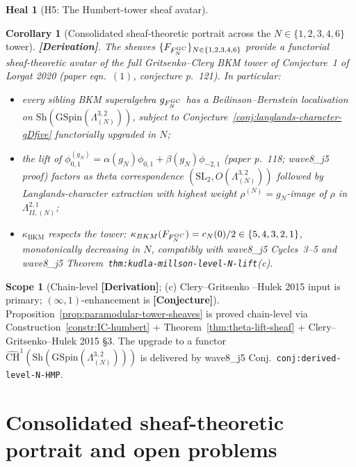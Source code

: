\documentclass[11pt]{amsart}
\newtheorem{corollary}[theorem]{Corollary}
\theoremstyle{definition}
\newtheorem{heal}[attack]{Heal}
\newtheorem{scope}[theorem]{Scope}
\providecommand{\kBKM}{\kappa_{\mathrm{BKM}}}
\providecommand{\Sh}{\mathrm{Sh}}
\providecommand{\GSpin}{\mathrm{GSpin}}
\providecommand{\SL}{\mathrm{SL}}
\providecommand{\cF}{\mathcal{F}}
\providecommand{\cCH}{\widehat{\mathrm{CH}}}
\providecommand{\ClaimStatusDerivation}{\textbf{[Derivation]}}
\begin{document}
\begin{heal}[H5: The Humbert-tower sheaf avatar]
\begin{corollary}[Consolidated sheaf-theoretic portrait across the
$N \in \{1, 2, 3, 4, 6\}$ tower]\label{cor:tower-portrait}
\ClaimStatusDerivation.  The sheaves $\{\cF_{F^{\rm GC}_N}\}_{N \in
\{1, 2, 3, 4, 6\}}$ provide a functorial sheaf-theoretic avatar of
the full Gritsenko--Clery BKM tower of Conjecture~1 of Lorgat 2020
(paper eqn.~$(1)$, conjecture p.~121). In particular:
\begin{itemize}
 \item every sibling BKM superalgebra $\mathfrak{g}_{F^{\rm GC}_N}$
   has a Beilinson--Bernstein localisation on
   $\Sh(\GSpin(\Lambda^{3,2}_{(N)}))$, subject to
   Conjecture~\ref{conj:langlands-character-gDfive} functorially
   upgraded in $N$;
 \item the lift of $\phi^{(g_N)}_{0,1} = \alpha(g_N)\phi_{0,1}
   + \beta(g_N)\phi_{-2,1}$ (paper p.~118; wave8\_j5 proof)
   factors as theta correspondence $(\SL_2, O(\Lambda^{3,2}_{(N)}))$
   followed by Langlands-character extraction with highest weight
   $\rho^{(N)} = g_N$-image of $\rho$ in $\Lambda^{2,1}_{II,(N)}$;
 \item $\kBKM$ respects the tower: $\kBKM(\cF_{F^{\rm GC}_N}) =
   c_N(0)/2 \in \{5, 4, 3, 2, 1\}$, monotonically decreasing in $N$,
   compatibly with wave8\_j5 Cycles~3--5 and
   wave8\_j5 Theorem~\texttt{thm:kudla-millson-level-N-lift}(c).
\end{itemize}
\end{corollary}

\begin{scope}[Chain-level \textbf{[Derivation]}; (c) Clery--Gritsenko
--Hulek 2015 input is primary; $(\infty,1)$-enhancement is
\textbf{[Conjecture]}]
Proposition~\ref{prop:paramodular-tower-sheaves} is proved
chain-level via Construction~\ref{constr:IC-humbert} +
Theorem~\ref{thm:theta-lift-sheaf} + Clery--Gritsenko--Hulek 2015 \S3.
The upgrade to a functor $\cCH^1(\Sh(\GSpin(\Lambda^{3,2}_{(N)})))$
is delivered by wave8\_j5 Conj.~\texttt{conj:derived-level-N-HMP}.
\end{scope}
\end{heal}

\section{Consolidated sheaf-theoretic portrait and open problems}
\end{document}
